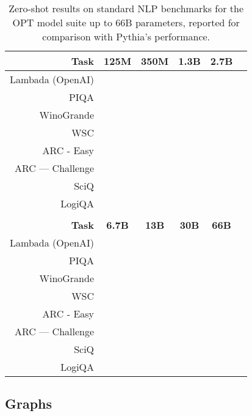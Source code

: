 \documentclass{article}
\theoremstyle{plain}
\theoremstyle{definition}
\theoremstyle{remark}
\begin{document}
\begin{table}[H]
\centering
\begin{tabular}{rccccc}
\hline
\textbf{Task} & \textbf{125M} & \textbf{350M} & \textbf{1.3B} & \textbf{2.7B} \\
\hline
Lambada (OpenAI) &  &  &  &  \\
PIQA &  &  &  &  \\
WinoGrande &  &  &  &  \\
WSC &  &  &  &  \\
ARC - Easy &  &  &  &  \\
ARC — Challenge &  &  &  &  \\
SciQ &  &  &  &  \\
LogiQA &  &  &  &  \\
\bottomrule
\\
\textbf{Task} & \textbf{6.7B} & \textbf{13B} & \textbf{30B} & \textbf{66B} \\
\midrule
Lambada (OpenAI) &  &  &  &  \\
PIQA &  &  &  &  \\
WinoGrande &  &  &  &  \\
WSC &  &  &  &  \\
ARC - Easy &  &  &  &  \\
ARC — Challenge &  &  &  &  \\
SciQ &  &  &  &  \\
LogiQA &  &  &  &  \\
\bottomrule
\end{tabular}
\caption{Zero-shot results on standard NLP benchmarks for the OPT model suite up to 66B parameters, reported for comparison with Pythia's performance.}
\end{table}

\clearpage

\subsection{Graphs}\label{app:eval-plots}
\usetikzlibrary {decorations}
\pgfplotsset{compat=1.16}
\usetikzlibrary{external}\tikzexternalize
\end{document}
